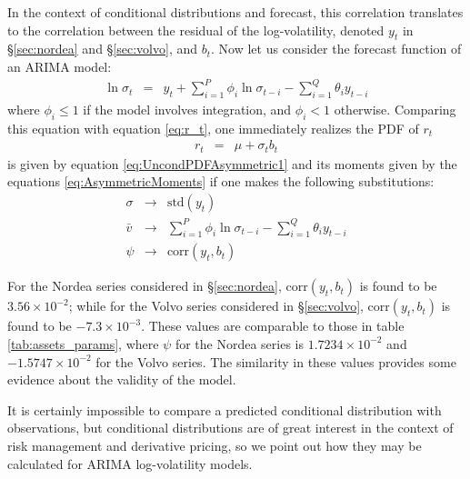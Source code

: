 In the context of conditional distributions and forecast, this
correlation translates to the correlation between the residual of the
log-volatility, denoted $y_t$ in \S\ref{sec:nordea} and
\S\ref{sec:volvo}, and $b_t$. Now let us consider the forecast
function of an ARIMA model:
\begin{eqnarray*}
  \ln \sigma_t &=& y_t + \sum_{i=1}^P \phi_i \ln \sigma_{t-i} -
  \sum_{i=1}^Q \theta_i y_{t-i}
\end{eqnarray*}
where $\phi_i \leq 1$ if the model involves integration, and $\phi_i <
1$ otherwise. Comparing this equation with equation \ref{eq:r_t}, one
immediately realizes the PDF of $r_t$
\begin{eqnarray*}
  r_t &=& \mu + \sigma_t b_t
\end{eqnarray*}
is given by equation \ref{eq:UncondPDFAsymmetric1} and its moments
given by the equations \ref{eq:AsymmetricMoments} if one makes the
following substitutions:
\begin{eqnarray*}
  \sigma &\to& \text{std}(y_t) \\
  \bar{v} &\to& \sum_{i=1}^P \phi_i \ln \sigma_{t-i} - \sum_{i=1}^Q
  \theta_i y_{t-i} \\
  \psi &\to& \text{corr}(y_t, b_t)
\end{eqnarray*}

For the Nordea series considered in \S\ref{sec:nordea},
$\text{corr}(y_t, b_t)$ is found to be $3.56 \times 10^{-2}$; while
for the Volvo series considered in \S\ref{sec:volvo},
$\text{corr}(y_t, b_t)$ is found to be $-7.3 \times 10^{-3}$. These
values are comparable to those in table \ref{tab:assets_params}, where
$\psi$ for the Nordea series is $1.7234 \times 10^{-2}$ and $-1.5747
\times 10^{-2}$ for the Volvo series. The similarity in these values
provides some evidence about the validity of the model.

It is certainly impossible to compare a predicted conditional
distribution with observations, but conditional distributions are of
great interest in the context of risk management and derivative
pricing, so we point out how they may be calculated for ARIMA
log-volatility models.
